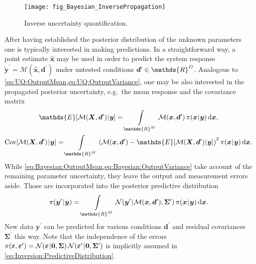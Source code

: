 \begin{figure}[htbp]
  \centering
  \texttt{[image: fig\_Bayesian\_InversePropagation]}
  \caption[Inverse uncertainty quantification]{Inverse uncertainty quantification.}
  \label{fig:Inversion:InversePropagation}
\end{figure}
\par %
After having established the posterior distribution of the unknown parameters one is typically interested in making predictions.
In a straightforward way, a point estimate \(\hat{\bm{x}}\) may be used in order to predict the system response
\(\tilde{\bm{y}}^\prime = \mathcal{M}(\hat{\bm{x}},\bm{d}^\prime)\) under untested conditions \(\bm{d}^\prime \in \mathds{R}^\dimControl\).
Analogous to \cref{eq:UQ:OutputMean,eq:UQ:OutputVariance}, one may be also interested in the propagated posterior uncertainty, e.g.\ the mean response and the covariance matrix
\begin{gather}
  \mathds{E}[\mathcal{M}(\bm{X},\bm{d}^\prime) \cond \bm{y}]
  = \int\limits_{\mathds{R}^\dimParam} \mathcal{M}(\bm{x},\bm{d}^\prime) \, \pi(\bm{x} \cond \bm{y}) \, \mathrm{d} \bm{x}, \label{eq:Bayesian:OutputMean} \\
  \mathrm{Cov}[\mathcal{M}(\bm{X},\bm{d}^\prime) \cond \bm{y}] = \int\limits_{\mathds{R}^\dimParam}
  \left( \mathcal{M}(\bm{x},\bm{d}^\prime) - \mathds{E}[\mathcal{M}(\bm{X},\bm{d}^\prime) \cond \bm{y}] \right)^2 \pi(\bm{x} \cond \bm{y}) \, \mathrm{d} \bm{x}. \label{eq:Bayesian:OutputVariance}
\end{gather}
While \cref{eq:Bayesian:OutputMean,eq:Bayesian:OutputVariance} take account of the remaining parameter uncertainty, they leave the output and measurement errors aside.
Those are incorporated into the posterior predictive distribution
\begin{equation} \label{eq:Inversion:PredictiveDistribution}
  \pi(\bm{y}^\prime \cond \bm{y})
  = \int\limits_{\mathds{R}^\dimParam} \mathcal{N}(\bm{y}^\prime \cond \mathcal{M}(\bm{x},\bm{d}^\prime), \bm{\Sigma}^\prime) \, \pi(\bm{x} \cond \bm{y}) \, \mathrm{d} \bm{x}.
\end{equation}
New data \(\bm{y}^\prime\) can be predicted for various conditions \(\bm{d}^\prime\) and residual covariances \(\bm{\Sigma}^\prime\) this way.
Note that the independence of the errors
\(\pi(\bm{\varepsilon},\bm{\varepsilon}^\prime) = \mathcal{N}(\bm{\varepsilon} {\:\!}|{\:\!} \bm{0}, \bm{\Sigma}) \, \mathcal{N}(\bm{\varepsilon}^\prime {\:\!}|{\:\!} \bm{0}, \bm{\Sigma}^\prime)\)
is implicitly assumed in \cref{eq:Inversion:PredictiveDistribution}.

